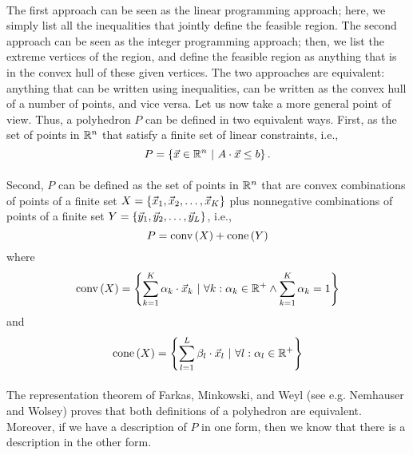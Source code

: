 \documentclass[titlepage]{book}
\theoremstyle{plain}
\theoremstyle{definition}
\theoremstyle{remark}
\begin{document}
\paragraph{}
The first approach can be seen as the linear programming approach; here, we simply list all the inequalities that jointly define the feasible region. The second approach can be seen as the integer programming approach; then, we list the extreme vertices of the region, and define the feasible region as anything that is in the convex hull of these given vertices. The two approaches are equivalent: anything that can be written using inequalities, can be written as the convex hull of a number of points, and vice versa. Let us now take a more general point of view. Thus, a polyhedron $P$ can be defined in two equivalent ways. First, as the set of points in $\RRR^n$ that satisfy a finite set of linear constraints, i.e.,
\begin{equation}
P=\condset{\vec{x}\in\RRR^n}{A\cdot\vec{x}\leq b}.
\end{equation}

\paragraph{}
Second, $P$ can be defined as the set of points in $\RRR^n$ that are convex combinations of points of a finite set $X=\accl{\vec{x}_1,\vec{x}_2,\ldots,\vec{x}_K}$ plus nonnegative combinations of points of a finite set $Y=\accl{\vec{y}_1,\vec{y}_2,\ldots,\vec{y}_L}$, i.e.,
\begin{equation}
P=\funm{conv}{X}+\funm{cone}{Y}
\end{equation}
where
\begin{equation}
\funm{conv}{X}=\condset{\sumieqb[k]{1}{K}{\alpha_k\cdot\vec{x}_k}}{\forall k:\alpha_k\in\RRR^+\wedge\sumieqb[k]{1}{K}{\alpha_k}=1}
\end{equation}
and
\begin{equation}
\funm{cone}{X}=\condset{\sumieqb[l]{1}{L}{\beta_l\cdot\vec{x}_l}}{\forall l:\alpha_l\in\RRR^+}
\end{equation}

\paragraph{}
The representation theorem of Farkas, Minkowski, and Weyl (see e.g. Nemhauser and Wolsey\cite{citeulike:2212037}) proves that both definitions of a polyhedron are equivalent. Moreover, if we have a description of $P$ in one form, then we know that there is a description in the other form.
\end{document}
